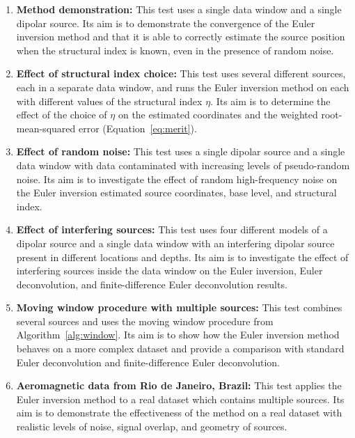 \begin{enumerate}
    \item \textbf{Method demonstration:} This test uses a single data window
        and a single dipolar source. Its aim is to demonstrate the convergence
        of the Euler inversion method and that it is able to correctly estimate
        the source position when the structural index is known, even in the
        presence of random noise.
    \item \textbf{Effect of structural index choice:} This test uses several
        different sources, each in a separate data window, and runs the Euler
        inversion method on each with different values of the structural index
        $\eta$. Its aim is to determine the effect of the choice of $\eta$ on
        the estimated coordinates and the weighted root-mean-squared error
        (Equation~\ref{eq:merit}).
    \item \textbf{Effect of random noise:} This test uses a single dipolar
        source and a single data window with data contaminated with increasing
        levels of pseudo-random noise. Its aim is to investigate the effect of
        random high-frequency noise on the Euler inversion estimated source
        coordinates, base level, and structural index.
    \item \textbf{Effect of interfering sources:} This test uses four different
        models of a dipolar source and a single data window with an interfering
        dipolar source present in different locations and depths. Its aim is to
        investigate the effect of interfering sources inside the data window on
        the Euler inversion, Euler deconvolution, and finite-difference Euler
        deconvolution results.
    \item \textbf{Moving window procedure with multiple sources:} This test
        combines several sources and uses the moving window procedure from
        Algorithm~\ref{alg:window}. Its aim is to show how the Euler inversion
        method behaves on a more complex dataset and provide a comparison with
        standard Euler deconvolution and finite-difference Euler deconvolution.
    \item \textbf{Aeromagnetic data from Rio de Janeiro, Brazil:} This test applies
        the Euler inversion method to a real dataset which contains multiple
        sources. Its aim is to demonstrate the effectiveness of the method
        on a real dataset with realistic levels of noise, signal overlap,
        and geometry of sources.
\end{enumerate}

